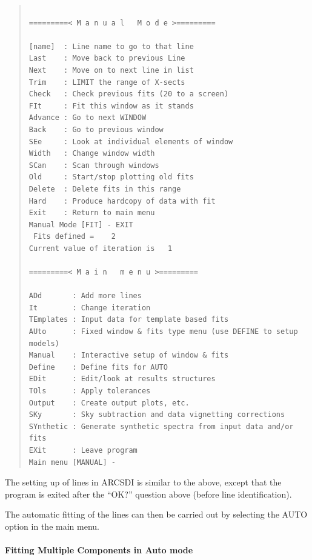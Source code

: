\begin{quote}\begin{verbatim}
 
=========< M a n u a l   M o d e >=========
 
[name]  : Line name to go to that line
Last    : Move back to previous Line
Next    : Move on to next line in list
Trim    : LIMIT the range of X-sects
Check   : Check previous fits (20 to a screen)
FIt     : Fit this window as it stands
Advance : Go to next WINDOW
Back    : Go to previous window
SEe     : Look at individual elements of window
Width   : Change window width
SCan    : Scan through windows
Old     : Start/stop plotting old fits
Delete  : Delete fits in this range
Hard    : Produce hardcopy of data with fit
Exit    : Return to main menu
Manual Mode [FIT] - EXIT
 Fits defined =    2
Current value of iteration is   1
 
=========< M a i n   m e n u >=========
 
ADd       : Add more lines
It        : Change iteration
TEmplates : Input data for template based fits
AUto      : Fixed window & fits type menu (use DEFINE to setup models)
Manual    : Interactive setup of window & fits
Define    : Define fits for AUTO
EDit      : Edit/look at results structures
TOls      : Apply tolerances
Output    : Create output plots, etc.
SKy       : Sky subtraction and data vignetting corrections
SYnthetic : Generate synthetic spectra from input data and/or fits
EXit      : Leave program
Main menu [MANUAL] -
\end{verbatim}\end{quote}

The setting up of lines in ARCSDI is similar to the above, except that
the program is exited after the ``OK?'' question above (before line
identification).

The automatic fitting of the lines can then be carried out by
selecting the AUTO option in the main menu.

\paragraph{Fitting Multiple Components in Auto mode}
\label{long.mb}

